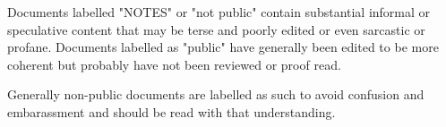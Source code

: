 
Documents labelled "NOTES" or "not public" contain
substantial informal or speculative content that
may be terse and poorly edited or even sarcastic or profane.
Documents labelled as "public" have generally been edited
to be more coherent but probably have not been reviewed
or proof read. 

Generally non-public documents are labelled as such to avoid
confusion and embarassment and should be read with that understanding.
